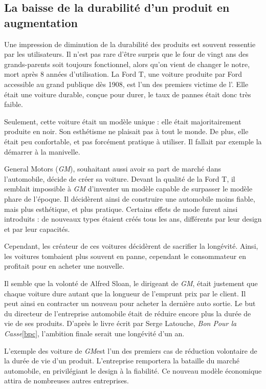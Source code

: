 \subsection{La baisse de la durabilité d'un produit en augmentation}

Une impression de diminution de la durabilité des produits est souvent ressentie par les utilisateurs.  Il n'est pas rare d'être surpris que le four de vingt ans des grands-parents soit toujours fonctionnel, alors qu'on vient de changer le notre, mort après 8 années d'utilisation. 
\smallbreak
La Ford T, une voiture produite par Ford accessible au grand publique dès 1908, est l'un des premiers victime de l'\op. Elle était une voiture durable, conçue pour durer, le taux de pannes était donc très faible.   

Seulement, cette voiture était un modèle unique : elle était majoritairement produite en noir. Son esthétisme ne plaisait pas à tout le monde. De plus, elle était peu confortable, et pas forcément pratique à utiliser. Il fallait par exemple la démarrer à la manivelle. 

General Motors (\textit{GM}), souhaitant aussi avoir sa part de marché dans l'automobile, décide de créer sa voiture. Devant la qualité de la Ford T, il semblait impossible à \textit{GM} d'inventer un modèle capable de surpasser le modèle phare de l'époque. Il décidèrent ainsi de construire une automobile moins fiable, mais plus esthétique, et plus pratique. Certains effets de mode furent ainsi introduits : de nouveaux types étaient créés tous les ans, différents par leur design et par leur capacités.

Cependant, les créateur de ces voitures décidèrent de sacrifier la longévité. Ainsi, les voitures tombaient plus souvent en panne, cependant le consommateur en profitait pour en acheter une nouvelle. 

Il semble que la volonté de Alfred Sloan, le dirigeant de \textit{GM}, était justement que chaque voiture dure autant que la longueur de l'emprunt prix par le client. Il peut ainsi en contracter un nouveau pour acheter la dernière auto sortie. Le but du directeur de l'entreprise automobile était de réduire encore plus la durée de vie de ses produits. D'après le livre écrit par Serge Latouche, \textit{Bon Pour la Casse}\ref{bpc}, l'ambition finale serait une longévité d'un an. 

\smallbreak
L'exemple des voiture de \textit{GM}est l'un des premiers cas de réduction volontaire de la durée de vie d'un produit. L'entreprise remportera la bataille du marché automobile, en privilégiant le design à la fiabilité. Ce nouveau modèle économique attira de nombreuses autres entreprises. 

